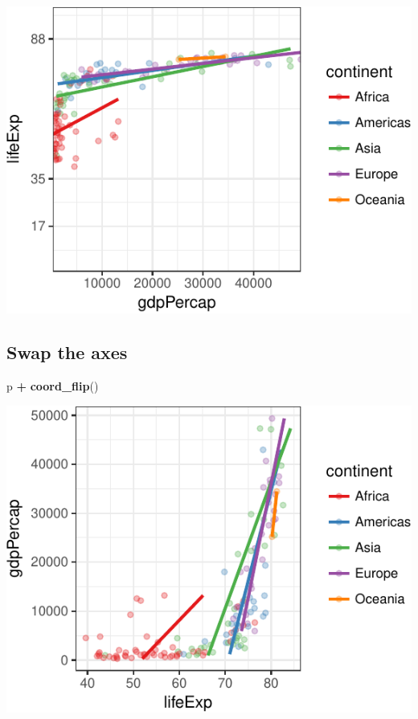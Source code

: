 \documentclass[12pt,]{krantz}
\makeatletter
\newenvironment{Shaded}{\begin{snugshade}}{\end{snugshade}}
\newcommand{\KeywordTok}[1]{\textcolor[rgb]{0.13,0.29,0.53}{\textbf{#1}}}
\newcommand{\NormalTok}[1]{#1}
\newcommand{\OperatorTok}[1]{\textcolor[rgb]{0.81,0.36,0.00}{\textbf{#1}}}
\newcommand{\StringTok}[1]{\textcolor[rgb]{0.31,0.60,0.02}{#1}}
\newenvironment{kframe}{%
\medskip{}
\setlength{\fboxsep}{.8em}
 \def\at@end@of@kframe{}%
 \ifinner\ifhmode%
  \def\at@end@of@kframe{\end{minipage}}%
  \begin{minipage}{\columnwidth}%
 \fi\fi%
 \def\FrameCommand##1{\hskip\@totalleftmargin \hskip-\fboxsep
 \colorbox{shadecolor}{##1}\hskip-\fboxsep
     \hskip-\linewidth \hskip-\@totalleftmargin \hskip\columnwidth}%
 \MakeFramed {\advance\hsize-\width
   \@totalleftmargin\z@ \linewidth\hsize
   \@setminipage}}%
 {\par\unskip\endMakeFramed%
 \at@end@of@kframe}
\renewenvironment{Shaded}{\begin{kframe}}{\end{kframe}}
\theoremstyle{definition}
\theoremstyle{definition}
\theoremstyle{definition}
\theoremstyle{remark}
\makeatother
\begin{document}
\includegraphics{05_fine_tuning_plots_files/figure-latex/unnamed-chunk-8-1.pdf}

\hypertarget{swap-the-axes}{%
\subsection{Swap the axes}\label{swap-the-axes}}

\begin{Shaded}
\begin{Highlighting}[]
\NormalTok{p }\OperatorTok{+}
\StringTok{  }\KeywordTok{coord_flip}\NormalTok{()}
\end{Highlighting}
\end{Shaded}

\includegraphics{05_fine_tuning_plots_files/figure-latex/unnamed-chunk-9-1.pdf}
\end{document}
